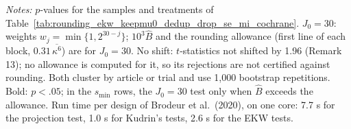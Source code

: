 \begin{table}[htbp]
\medskip
\begin{minipage}{\linewidth}
\footnotesize
\textit{Notes:} $p$-values for the samples and treatments of Table~\ref{tab:rounding_ekw_keepmu0_dedup_drop_se_mi_cochrane}.
$J_0=30$: weights $w_j=\min\{1,2^{30-j}\}$; $10^3\widehat{B}$ and the rounding allowance (first line of each block, $0.31\,\overline{\kappa^6}$) are for $J_0=30$.
No shift: $t$-statistics not shifted by 1.96 (Remark 13); no allowance is computed for it, so its rejections are not certified against rounding.
Both cluster by article or trial and use 1,000 bootstrap repetitions.
Bold: $p<.05$; in the $s_{\min}$ rows, the $J_0=30$ test only when $\widehat{B}$ exceeds the allowance.
Run time per design of Brodeur et al.\ (2020), on one core: 7.7 s for the projection test, 1.0 s for Kudrin's tests, 2.6 s for the EKW tests.
\end{minipage}
\end{table}
